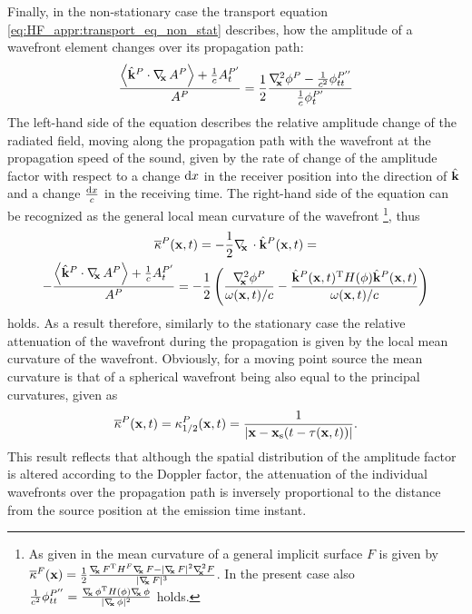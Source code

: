 Finally, in the non-stationary case the transport equation \eqref{eq:HF_appr:transport_eq_non_stat} describes, how the amplitude of a wavefront element changes over its propagation path:
\begin{equation}
\frac{ \left< \hat{\mathbf{k}}^P \cdot \nabla_{\!\!\mathbf{x}}\, A^P \right>+\frac{1}{c} A^{P'}_t }{A^P}  = \frac{1}{2} \frac{ \nabla^2_{\!\!\mathbf{x}} \phi^P - \frac{1}{c^2} \phi^{P''}_{tt} }{\frac{1}{c}\phi^{P'}_t}
\end{equation}
The left-hand side of the equation describes the relative amplitude change of the radiated field, moving along the propagation path with the wavefront at the propagation speed of the sound, given by the rate of change of the amplitude factor with respect to a change $\mathrm{d} x$ in the receiver position into the direction of $\hat{\mathbf{k}}$ and a change $\frac{\mathrm{d} x}{c}$ in the receiving time.
The right-hand side of the equation can be recognized as the general local mean curvature of the wavefront \cite[4.2]{Goldman2005}\footnote{As given in \cite{Goldman2005} the mean curvature of a general implicit surface $F$ is given by 
$\overline{\kappa}^F(\vx) = \frac{1}{2}\frac{\Dx F^{\mathrm{T}} H^F \Dx F - |\Dx F|^2 \Lx F }{|\Dx F|^3}$. In the present case also $\frac{1}{c^2} \phi^{P''}_{tt} = \frac{\nabla_{\!\!\mathbf{x}}\, \phi^{\mathrm{T}} H(\phi) \nabla_{\!\!\mathbf{x}}\, \phi}{|\nabla_{\!\!\mathbf{x}}\, \phi|^2}$ holds.}, thus
\begin{multline}
\overline{\kappa}^P(\mathbf{x},t) = -\frac{1}{2}\nabla_{\!\!\mathbf{x}}\, \cdot \hat{\mathbf{k}}^P(\mathbf{x},t)= \\
-\frac{ \left< \hat{\mathbf{k}}^P \cdot \nabla_{\!\!\mathbf{x}}\, A^P \right>+\frac{1}{c} A^{P'}_t }{A^P} = -\frac{1}{2} \left( \frac{ \nabla^2_{\!\!\mathbf{x}} \phi^P  }{ \omega(\mathbf{x},t)/c } - \frac{ \hat{\mathbf{k}}^P(\mathbf{x},t)^{\mathrm{T}} H(\phi) \hat{\mathbf{k}}^P(\mathbf{x},t) }{ \omega(\mathbf{x},t)/c } \right)
\label{Eq:Moving_source:attenuation}
\end{multline}
holds.
As a result therefore, similarly to the stationary case the relative attenuation of the wavefront during the propagation is given by the local mean curvature of the wavefront.
Obviously, for a moving point source the mean curvature is that of a spherical wavefront being also equal to the principal curvatures, given as
\begin{equation}
\overline{\kappa}^P(\mathbf{x},t) = \kappa^P_{1/2}(\mathbf{x},t) = \frac{1}{|\mathbf{x}-\mathbf{x}_{\mathrm{s}}(t-\tau(\mathbf{x},t))|}.
\label{Eq:Moving_source:attenuation_2}
\end{equation}
This result reflects that although the spatial distribution of the amplitude factor is altered according to the Doppler factor, the attenuation of the individual wavefronts over the propagation path is inversely proportional to the distance from the source position at the emission time instant.

